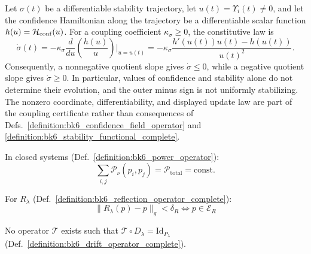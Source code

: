 \begin{axiom}
\label{axiom:bk6_confidence_stability_coupling}
Let $\sigma(t)$ be a differentiable stability trajectory, let
$u(t)=\Upsilon_i(t)\neq0$, and let the confidence Hamiltonian along the
trajectory be a differentiable scalar function $h(u)=\mathcal H_{\rm conf}(u)$.
For a coupling coefficient $\kappa_\sigma\geq0$, the constitutive law is
\[
 \dot\sigma(t)=-\kappa_\sigma
   \frac{d}{du}\left(\frac{h(u)}{u}\right)\bigg|_{u=u(t)}
 =-\kappa_\sigma
   \frac{h'(u(t))u(t)-h(u(t))}{u(t)^2}.
\]
Consequently, a nonnegative quotient slope gives $\dot\sigma\leq0$, while a
negative quotient slope gives $\dot\sigma\geq0$.  In particular, values of
confidence and stability alone do not determine their evolution, and the
outer minus sign is not uniformly stabilizing.  The nonzero coordinate,
differentiability, and displayed update law are part of the coupling
certificate rather than consequences of Defs.~\ref{definition:bk6_confidence_field_operator}
and \ref{definition:bk6_stability_functional_complete}.
\end{axiom}

\begin{axiom}
\label{axiom:bk6_power_conservation}
In closed systems (Def.~\ref{definition:bk6_power_operator}):
\begin{equation}
\sum_{i,j} \mathcal{P}_\nu(p_i, p_j) = \mathcal{P}_{\text{total}} = \text{const.}
\end{equation}
\end{axiom}

\begin{axiom}
\label{axiom:bk6_reflective_coherence_complete}
For \(R_\lambda\) (Def.~\ref{definition:bk6_reflection_operator_complete}):
\begin{equation}
\|R_\lambda(p) - p\|_g < \delta_R \iff p \in \mathcal{E}_R
\end{equation}
\end{axiom}

\begin{axiom}
\label{axiom:bk6_symbolic_time_irreversibility_complete}
No operator $\mathcal{T}$ exists such that $\mathcal{T} \circ D_\lambda = \text{Id}_{P_{\lambda}}$ (Def.~\ref{definition:bk6_drift_operator_complete}).
\end{axiom}

